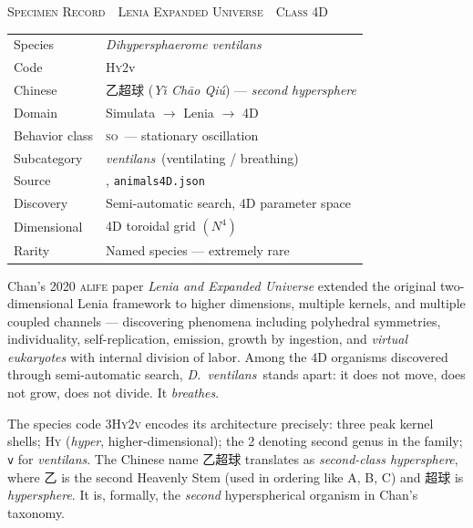 \documentclass[11pt,a4paper]{article}
\newcommand{\spc}[1]{\textit{#1}}  %
\newcommand{\ventilans}{\textit{ventilans}}
\newcommand{\DV}{\spc{D.\ ventilans}}
\newcommand{\SO}{\textsc{so}}
\begin{document}
\begin{specimenbox}
\sffamily\footnotesize\color{headinc}
\textsc{Specimen Record \,\textperiodcentered\, Lenia Expanded Universe \,\textperiodcentered\, Class 4D}\\[6pt]
\begin{tabularx}{\linewidth}{@{}l>{\raggedright\arraybackslash}X@{}}
\toprule
Species            & \textit{Dihypersphaerome ventilans}\\
Code               & 3\textsc{Hy}2v\\
Chinese            & 乙超球 (\textit{Y\v{\i} Ch\={a}o Qi\'u}) --- \textit{second hypersphere}\\
Domain             & Simulata $\rightarrow$ Lenia $\rightarrow$ 4D\\
Behavior class     & \SO\ --- stationary oscillation\\
Subcategory        & \ventilans\ (ventilating / breathing)\\
Source             & \citet{chan2020}, \texttt{animals4D.json}\\
Discovery          & Semi-automatic search, 4D parameter space\\
Dimensional        & 4D toroidal grid $(N^{4})$\\
Rarity             & Named species --- extremely rare\\
\bottomrule
\end{tabularx}
\end{specimenbox}

Chan's 2020 \textsc{alife} paper \textit{Lenia and Expanded Universe}
extended the original two-dimensional Lenia framework to higher dimensions,
multiple kernels, and multiple coupled channels --- discovering phenomena
including polyhedral symmetries, individuality, self-replication, emission,
growth by ingestion, and \textit{virtual eukaryotes} with internal division
of labor. Among the 4D organisms discovered through semi-automatic search,
\DV\ stands apart: it does not move, does not grow, does not divide. It
\textit{breathes}.

The species code \textsc{3Hy2v} encodes its architecture precisely: three
peak kernel shells; \textsc{Hy} (\textit{hyper}, higher-dimensional); the
\textsc{2} denoting second genus in the family; \texttt{v} for \ventilans.
The Chinese name 乙超球 translates as \emph{second-class hypersphere},
where 乙 is the second Heavenly Stem (used in ordering like A, B, C) and
超球 is \emph{hypersphere}. It is, formally, the \textit{second}
hyperspherical organism in Chan's taxonomy.
\end{document}
